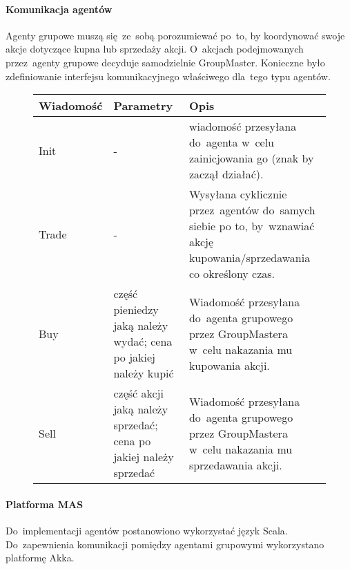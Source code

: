 \documentclass[11pt,a4paper]{article}
\begin{document}
\paragraph{Komunikacja agentów}
Agenty grupowe muszą się~ze~sobą porozumiewać po~to, by koordynować swoje akcje dotyczące kupna lub sprzedaży
akcji. O~akcjach podejmowanych przez~agenty grupowe decyduje samodzielnie GroupMaster.
Konieczne było zdefiniowanie interfejsu komunikacyjnego właściwego dla~tego typu agentów.

\begin{figure}[H]
  \begin{tabularx}{\textwidth}{ |p{4cm}|p{2.5cm}|X| }
    \hline
    \textbf{Wiadomość} & \textbf{Parametry} & \textbf{Opis} \\
    \hline
    Init & - & wiadomość przesyłana do~agenta w~celu zainicjowania go (znak by zaczął działać).\\
    \hline
    Trade & - & Wysyłana cyklicznie przez~agentów do~samych siebie po to, by~wznawiać akcję
    kupowania/sprzedawania co określony czas. \\
    \hline
    Buy & część pieniedzy jaką należy wydać; cena po jakiej należy kupić & Wiadomość przesyłana do~agenta
    grupowego przez GroupMastera w~celu nakazania mu kupowania akcji.\\
    \hline
    Sell & część akcji jaką należy sprzedać; cena po jakiej należy sprzedać & Wiadomość przesyłana
    do~agenta grupowego przez GroupMastera w~celu nakazania mu sprzedawania akcji.\\
    \hline
  \end{tabularx}
\end{figure}

\paragraph{Platforma MAS}
Do~implementacji agentów postanowiono wykorzystać język Scala. Do~zapewnienia komunikacji pomiędzy agentami
grupowymi wykorzystano platformę Akka.
\end{document}
